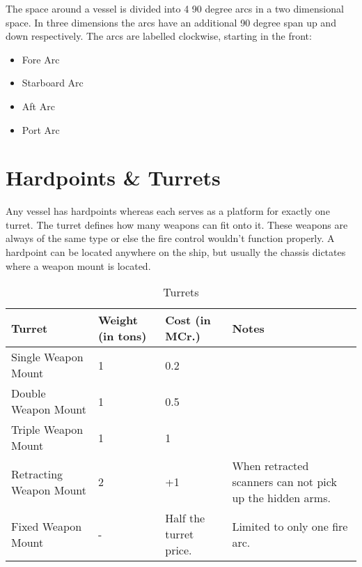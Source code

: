 The space around a vessel is divided into 4 90 degree arcs in a two dimensional space. In three dimensions the arcs have an additional 90 degree span up and down respectively. The arcs are labelled clockwise, starting in the front:

\begin{itemize}
  \item Fore Arc
  \item Starboard Arc
  \item Aft Arc
  \item Port Arc
\end{itemize}

\section{Hardpoints \& Turrets}
\label{sec:Hardpoints & Turrets}

Any vessel has hardpoints whereas each serves as a platform for exactly one turret. The turret defines how many weapons can fit onto it. These weapons are always of the same type or else the fire control wouldn't function properly. A hardpoint can be located anywhere on the ship, but usually the chassis dictates where a weapon mount is located.

\begin{table}[H]
  \centering
  \caption{Turrets}
  \begin{tabularx}{\textwidth}{|l|l|l|X|}
    \hline
    Turret                  & Weight (in tons) & Cost (in MCr.)         & Notes                                                    \\ \hline
    Single Weapon Mount     & 1      & 0.2                    & ~                                                        \\ \hline
    Double Weapon Mount     & 1      & 0.5                    & ~                                                        \\ \hline
    Triple Weapon Mount     & 1      & 1                      & ~                                                        \\ \hline
    Retracting Weapon Mount & 2      & +1                     & When retracted scanners can not pick up the hidden arms. \\ \hline
    Fixed Weapon Mount      & -      & Half the turret price. & Limited to only one fire arc.                            \\ \hline
  \end{tabularx}
\end{table}

